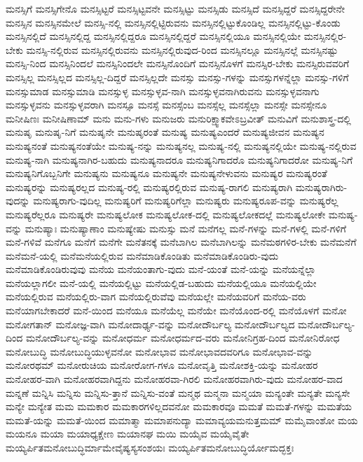 {ಮನಸ್ಸಿಗೆ
ಮನಸ್ಸಿಗೇನೊ
ಮನಸ್ಸಿಟ್ಟರೆ
ಮನಸ್ಸಿಟ್ಟವನೇ
ಮನಸ್ಸಿಟ್ಟು
ಮನಸ್ಸಿಡು
ಮನಸ್ಸಿದೆ
ಮನಸ್ಸಿದ್ದರೆ
ಮನಸ್ಸಿದ್ದರೇನೇ
ಮನಸ್ಸಿನ
ಮನಸ್ಸಿನಮೇಲೆ
ಮನಸ್ಸಿ-ನಲ್ಲಿ
ಮನಸ್ಸಿನಲ್ಲಿಟ್ಟಿರುವನು
ಮನಸ್ಸಿನಲ್ಲಿಟ್ಟುಕೊಂಡಿಲ್ಲ
ಮನಸ್ಸಿನಲ್ಲಿಟ್ಟು-ಕೊಂಡು
ಮನಸ್ಸಿನಲ್ಲಿದೆ
ಮನಸ್ಸಿನಲ್ಲಿದ್ದ
ಮನಸ್ಸಿನಲ್ಲಿದ್ದರೂ
ಮನಸ್ಸಿನಲ್ಲಿದ್ದರೆ
ಮನಸ್ಸಿನಲ್ಲಿಯೂ
ಮನಸ್ಸಿನಲ್ಲಿಯೇ
ಮನಸ್ಸಿನಲ್ಲಿರ-ಬೇಕು
ಮನಸ್ಸಿ-ನಲ್ಲಿರುವ
ಮನಸ್ಸಿನಲ್ಲಿರುವನು
ಮನಸ್ಸಿನಲ್ಲಿರುವುದ-ರಿಂದ
ಮನಸ್ಸಿನಲ್ಲೂ
ಮನಸ್ಸಿನಲ್ಲೆ
ಮನಸ್ಸಿನಷ್ಟು
ಮನಸ್ಸಿ-ನಿಂದ
ಮನಸ್ಸಿನಿಂದಲೆ
ಮನಸ್ಸಿನಿಂದಲೇ
ಮನಸ್ಸಿನೊಂದಿಗೆ
ಮನಸ್ಸಿನೊಳಗೆ
ಮನಸ್ಸಿರ-ಬೇಕು
ಮನಸ್ಸಿರುವವರಿಗೆ
ಮನಸ್ಸಿಲ್ಲ
ಮನಸ್ಸಿಲ್ಲದ
ಮನಸ್ಸಿಲ್ಲ-ದಿದ್ದರೆ
ಮನಸ್ಸಿಲ್ಲದೇ
ಮನಸ್ಸು
ಮನಸ್ಸು-ಗಳನ್ನು
ಮನಸ್ಸುಗಳನ್ನೆಲ್ಲಾ
ಮನಸ್ಸು-ಗಳಿಗೆ
ಮನಸ್ಸುಮಾಡ
ಮನಸ್ಸುಮಾಡಿ
ಮನಸ್ಸುಳ್ಳ
ಮನಸ್ಸುಳ್ಳವ-ನಾಗಿ
ಮನಸ್ಸುಳ್ಳವನಾಗಿರುವನು
ಮನಸ್ಸುಳ್ಳವನಾಗು
ಮನಸ್ಸುಳ್ಳವನು
ಮನಸ್ಸುಳ್ಳವರಾಗಿ
ಮನಸ್ಸೂ
ಮನಸ್ಸೆ
ಮನಸ್ಸೆಂಬ
ಮನಸ್ಸೆಲ್ಲ
ಮನಸ್ಸೆಲ್ಲಾ
ಮನಸ್ಸೇ
ಮನಸ್ಸೇನೂ
ಮನೀಷಿಣಃ
ಮನೀಷಿಣಾಮ್
ಮನು
ಮನು-ಗಳು
ಮನುಜರು
ಮನುರಿಕ್ಷ್ವಾಕವೇಽಬ್ರವೀತ್
ಮನುವಿಗೆ
ಮನುಶಾಸ್ತ್ರ-ದಲ್ಲಿ
ಮನುಷೃ
ಮನುಷೃ-ನಿಗೆ
ಮನುಷೃನೇ
ಮನುಷೃರಂತೆ
ಮನುಷ್ಯ
ಮನುಷ್ಯಎಂದರೆ
ಮನುಷ್ಯಜೀವನ
ಮನುಷ್ಯನ
ಮನುಷ್ಯನಂತೆ
ಮನುಷ್ಯನಂತೆಯೇ
ಮನುಷ್ಯ-ನನ್ನು
ಮನುಷ್ಯನಲ್ಲ
ಮನುಷ್ಯ-ನಲ್ಲಿ
ಮನುಷ್ಯನಲ್ಲಿಯೇ
ಮನುಷ್ಯ-ನಲ್ಲಿರುವ
ಮನುಷ್ಯ-ನಾಗಿ
ಮನುಷ್ಯನಾಗಿರ-ಬಹುದು
ಮನುಷ್ಯನಾದರೂ
ಮನುಷ್ಯನಿಗಾದರೊ
ಮನುಷ್ಯನಿಗಾದರೋ
ಮನುಷ್ಯ-ನಿಗೆ
ಮನುಷ್ಯನಿಗೊಬ್ಬನಿಗೇ
ಮನುಷ್ಯನು
ಮನುಷ್ಯನೂ
ಮನುಷ್ಯನೇ
ಮನುಷ್ಯನೇಳುವನು
ಮನುಷ್ಯರ
ಮನುಷ್ಯರಂತೆ
ಮನುಷ್ಯರನ್ನು
ಮನುಷ್ಯರಲ್ಲದ
ಮನುಷ್ಯ-ರಲ್ಲಿ
ಮನುಷ್ಯರಲ್ಲಿರುವ
ಮನುಷ್ಯ-ರಾಗಲಿ
ಮನುಷ್ಯರಾಗಿ
ಮನುಷ್ಯರಾಗಿರು-ವುದನ್ನು
ಮನುಷ್ಯರಾಗು-ವುದಿಲ್ಲ
ಮನುಷ್ಯರಿಗೆ
ಮನುಷ್ಯರಿಗೆಲ್ಲಾ
ಮನುಷ್ಯರು
ಮನುಷ್ಯರೂಪ-ವನ್ನು
ಮನುಷ್ಯರೆಲ್ಲ
ಮನುಷ್ಯರೆಲ್ಲರೂ
ಮನುಷ್ಯರೇ
ಮನುಷ್ಯಲೋಕ
ಮನುಷ್ಯಲೋಕ-ದಲ್ಲಿ
ಮನುಷ್ಯಲೋಕದಲ್ಲೆ
ಮನುಷ್ಯಲೋಕೇ
ಮನುಷ್ಯ-ವನ್ನು
ಮನುಷ್ಯಾಃ
ಮನುಷ್ಯಾಣಾಂ
ಮನುಷ್ಯೇಷು
ಮನುಸ್ಸು
ಮನೆ
ಮನೆಗಲ್ಲ
ಮನೆ-ಗಳನ್ನು
ಮನೆ-ಗಳಲ್ಲಿ
ಮನೆ-ಗಳಿಗೆ
ಮನೆ-ಗಳಿವೆ
ಮನೆಗೂ
ಮನೆಗೆ
ಮನೆಗೇ
ಮನೆತನಕ್ಕೆ
ಮನೆಬಾಗಿಲ
ಮನೆಬಾಗಿಲನ್ನು
ಮನೆಮಠಗಳಿರ-ಬೇಕು
ಮನೆಮನೆಗೆ
ಮನೆಮನೆ-ಯಲ್ಲಿ
ಮನೆಮನೆಯಲ್ಲಿರುವ
ಮನೆಮಾಡಿಕೊಂಡಿತು
ಮನೆಮಾಡಿಕೊಂಡಿರು-ವುದು
ಮನೆಮಾಡಿಕೊಂಡಿರುವುವು
ಮನೆಯ
ಮನೆಯಂತಾಗು-ವುದು
ಮನೆ-ಯಂತೆ
ಮನೆ-ಯನ್ನು
ಮನೆಯನ್ನೆಲ್ಲಾ
ಮನೆಯಲ್ಲಾಗಲೀ
ಮನೆ-ಯಲ್ಲಿ
ಮನೆಯಲ್ಲಿಟ್ಟು
ಮನೆಯಲ್ಲಿಡ-ಬಹುದು
ಮನೆಯಲ್ಲಿಯೂ
ಮನೆಯಲ್ಲಿಯೇ
ಮನೆಯಲ್ಲಿರುವ
ಮನೆಯಲ್ಲಿರು-ವಾಗ
ಮನೆಯಲ್ಲಿರುವೆವು
ಮನೆಯಲ್ಲೇ
ಮನೆಯವರಿಗೆ
ಮನೆಯ-ವರು
ಮನೆಯಾಗಬೇಕಾದರೆ
ಮನೆ-ಯಿಂದ
ಮನೆಯೂ
ಮನೆಯೆಲ್ಲ
ಮನೆಯೇ
ಮನೆಯೊಂದ-ರಲ್ಲಿ
ಮನೆಯೊಳಗೆ
ಮನೋ
ಮನೋಗತಾನ್
ಮನೋಜ್ಞ-ವಾಗಿ
ಮನೋದಾರ್ಢ್ಯ-ವನ್ನು
ಮನೋದೌರ್ಬಲ್ಯ
ಮನೋದೌರ್ಬಲ್ಯದ
ಮನೋದೌರ್ಬಲ್ಯ-ದಿಂದ
ಮನೋದೌರ್ಬಲ್ಯ-ವನ್ನು
ಮನೋಧರ್ಮ
ಮನೋಧರ್ಮದ-ವರು
ಮನೋನಿಗ್ರಹ-ದಿಂದ
ಮನೋನಿರೋಧ
ಮನೋಬುದ್ಧಿ
ಮನೋಬುದ್ಧಿಯುಳ್ಳವನೋ
ಮನೋಭಾವ
ಮನೋಭಾವದವರಿಗೂ
ಮನೋಭಾವ-ವನ್ನು
ಮನೋರಥಮ್
ಮನೋರುಚಿಯ
ಮನೋರೋಗ-ಗಳೂ
ಮನೋವೃತ್ತಿ
ಮನೋಶಕ್ತಿ-ಯನ್ನು
ಮನೋಹರ
ಮನೋಹರ-ವಾಗಿ
ಮನೋಹರವಾಗಿದ್ದನು
ಮನೋಹರವಾ-ಗಿರಲಿ
ಮನೋಹರವಾಗಿರು-ವುದು
ಮನೋಹರ-ವಾದ
ಮನ್ನಣೆ
ಮನ್ನಿಸಿ
ಮನ್ನಿಸು
ಮನ್ನಿಸು-ತ್ತಾನೆ
ಮನ್ನಿಸು-ವಂತೆ
ಮನ್ಮಥ
ಮನ್ಮನಾ
ಮನ್ಮಯಾ
ಮನ್ಯಂತೇ
ಮನ್ಯತೇ
ಮನ್ಯಸೇ
ಮನ್ಯೇ
ಮನ್ಯೇತ
ಮಮ
ಮಮಕಾರ
ಮಮಕಾರಗಳಿಲ್ಲದವನೋ
ಮಮಕಾರವೂ
ಮಮತೆ
ಮಮತೆ-ಗಳನ್ನು
ಮಮತೆಯ
ಮಮತೆ-ಯನ್ನು
ಮಮತೆ-ಯಿಂದ
ಮಮಾತ್ಮಾ
ಮಮಾಪನುದ್ಯಾ
ಮಮಾವ್ಯಯಮನುತ್ತಮಮ್
ಮಮೈವಾಂಶೋ
ಮಯ
ಮಯನೂ
ಮಯಾ
ಮಯಾಧ್ಯಕ್ಷೇಣ
ಮಯಾನಘ
ಮಯಿ
ಮಯೈವ
ಮಯೈವೈತೇ
ಮಯ್ಯರ್ಪಿತಮನೋಬುದ್ಧಿರ್ಮಾಮೇವೈಷ್ಯಸ್ಯಸಂಶಯಃ
ಮಯ್ಯರ್ಪಿತಮನೋಬುದ್ಧಿರ್ಯೋಮದ್ಭಕ್ತಃ
}
